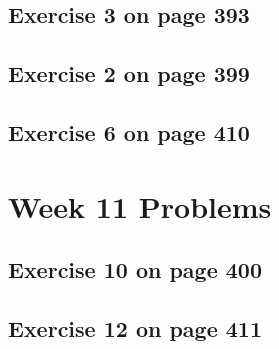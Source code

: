 \documentclass[12pt]{amsart}
\begin{document}
\subsection{ Exercise 3 on page 393}
\subsection{Exercise 2 on page 399} 
\subsection{Exercise 6 on page 410} 


\section{Week 11 Problems}
\subsection{Exercise 10 on page 400}
\subsection{Exercise 12 on page 411}



  
\end{document}
